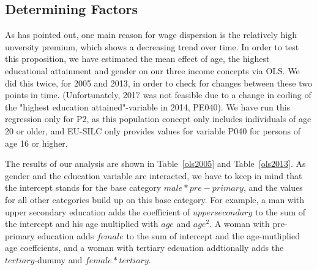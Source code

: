 \documentclass[a4paper]{article}\usepackage[]{graphicx}\usepackage[]{color}
\begin{document}
\subsection{Determining Factors}
As \cite{brzezinski2017} has pointed out, one main reason for wage dispersion is the relatively high unversity premium, which shows a decreasing trend over time. In order to test this proposition, we have estimated the mean effect of age, the highest educational attainment and gender on our three income concepts via OLS. We did this twice, for 2005 and 2013, in order to check for changes between these two points in time. (Unfortunately, 2017 was not feasible due to a change in coding of the "highest education attained"-variable in 2014, PE040). We have run this regression only for P2, as this population concept only includes individuals of age 20 or older, and EU-SILC only provides values for variable P040 for persons of age 16 or higher.

The results of our analysis are shown in Table~\ref{ols2005} and Table~\ref{ols2013}. As gender and the education variable are interacted, we have to keep in mind that the intercept stands for the base category $male*pre-primary$, and the values for all other categories build up on this base category. For example, a man with upper secondary education adds the coefficient of $upper secondary$ to the sum of the intercept and his age multiplied with $age$ and $age^2$. A woman with pre-primary education adds $female$ to the sum of intercept and the age-mutliplied age coeffcients, and a woman with tertiary edcuation addtionally adds the $tertiary$-dummy and $female*tertiary$.  
\end{document}
